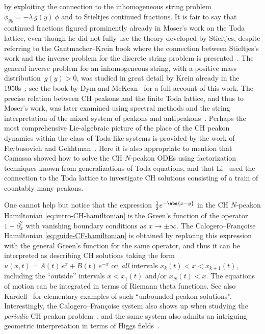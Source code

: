 \documentclass[10pt,a4paper]{article} \pdfoutput=1 
\begin{document}
by exploiting the connection to the inhomogeneous string problem
$\phi_{yy} = -\lambda \, g(y) \, \phi$
and to Stieltjes continued fractions.
It is fair to say that continued fractions figured prominently already in
Moser's work on the Toda lattice,
even though he did not fully use the theory developed by Stieltjes,
despite referring to the Gantmacher--Krein book
where the connection between Stieltjes's work and the inverse problem for
the discrete string problem is presented~\cite[Supplement II]{gantmacher-krein:2002:oscillation-matrices}.
The general inverse problem for an inhomogeneous string,
with a positive mass distribution~$g(y)>0$,
was studied in great detail by Krein already in the 1950s~\cite{krein:1952:inverse-string,kac-krein:1974:spectral-functions};
see the book by Dym and McKean~\cite{dym-mckean:1976:gaussian-processes}
for a full account of this work.
The precise relation between CH peakons and the finite Toda lattice,
and thus to Moser's work, was later examined using spectral methods
and the string interpretation of the mixed system of peakons and antipeakons~\cite{beals-sattinger-szmigielski:2001:peakons-strings-finite-Toda}.
Perhaps the most comprehensive Lie-algebraic picture of the place of
the CH peakon dynamics within the class of Toda-like systems is provided by the work of
Faybusovich and Gekhtman~\cite{faybusovich-gekhtman:2001:inverse-moment-problem-elementary-coadjoint-orbits}.
Here it is also appropriate to mention that
Camassa \cite{camassa:2000:CH-characteristic-variables, camassa:2003:CH-characteristics-initial-value-problem}
showed how to solve the CH $N$-peakon ODEs using factorization techniques
known from generalizations of Toda equations,
and that Li~\cite{li:2009:CH-long-time-behaviour-for-class-of-low-regularity-solutions-infinitely-many-peakons}
used the connection to the Toda lattice to investigate CH solutions consisting of a train
of countably many peakons.

One cannot help but notice that the expression $\frac12  e^{-\abs{x-y}}$
in the CH $N$-peakon Hamiltonian \eqref{eq:intro-CH-hamiltonian}
is the Green's function of the operator $1-\partial_x^2$
with vanishing boundary conditions as $x \to \pm \infty$.
The Calogero--Françoise Hamiltonian \eqref{eq:guide-CF-hamiltonian} is obtained
by replacing this expression with the general Green's function for the same operator,
and thus it can be interpreted as describing CH solutions taking the form
$u(x,t) = A(t) \, e^x + B(t) \, e^{-x}$ on \emph{all} intervals $x_k(t) < x < x_{k+1}(t)$,
including the ``outside'' intervals $x < x_1(t)$ and/or $x_N(t) < x$.
The equations of motion can be integrated in terms of Riemann theta functions.
See also Kardell~\cite{kardell:2015:CH-novikov-peakon-creation}
for elementary examples of such ``unbounded peakon solutions''.
Interestingly, the Calogero--Françoise system also shows up
when studying the \emph{periodic} CH peakon
problem~\cite{beals-sattinger-szmigielski:2002:CF-flows-periodic-peakons-2-peakon-2002,
  beals-sattinger-szmigielski:2005:CF-flows-periodic-peakons-N-peakon-2005},
and the same system also admits an intriguing geometric interpretation
in terms of Higgs fields~\cite{rayan-stanley-szmigielski:2020:CF-higgs-fields}.
\end{document}
